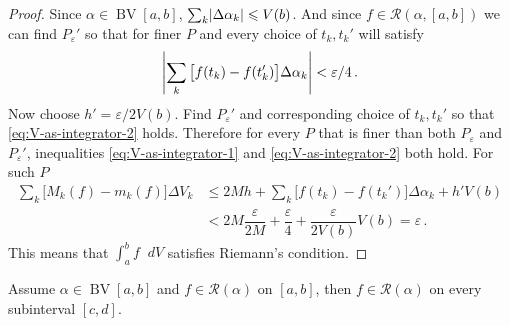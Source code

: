 \documentclass{article}
\newcommand{\Riemann}{\mathcal R}
\DeclarePairedDelimiter\abs{\lvert}{\rvert}
\newcommand{\dd}{\mathop{}\!d}
\DeclareMathOperator{\BV}{BV}
\begin{document}
\begin{proof}
    Since $ \alpha \in \BV[a, b] $, $ \sum_{k} \abs{ \Delta \alpha_k } \leqslant V(b) $. And since $ f \in \Riemann(\alpha, [a, b]) $ we can find $ P_\varepsilon' $ so that for finer $ P $ and every choice of $ t_k, t_k' $ will satisfy
    \[ 
        \abs*{ \sum_{k} \big[ f(t_k) - f(t_k') \big] \Delta \alpha_k } < \varepsilon / 4 \,.
    \]
     Now choose $ h' = \varepsilon / 2V(b) $. Find $ P_\varepsilon' $ and corresponding choice of $ t_k, t_k' $ so that \eqref{eq:V-as-integrator-2} holds. Therefore for every $ P $ that is finer than both $ P_\varepsilon $ and $ P_\varepsilon' $, inequalities \eqref{eq:V-as-integrator-1} and \eqref{eq:V-as-integrator-2} both hold. For such $ P $
    \begin{align*}
        \sum_k \big[ M_k(f) - m_k(f) \big] \Delta V_k &\leqslant 2 M h + \sum_{k} \big[ f(t_k) - f(t_k') \big] \Delta \alpha_k + h' V(b) \\
        &< 2 M \dfrac{\varepsilon}{2M} + \dfrac{\varepsilon}{4} + \dfrac{\varepsilon}{2 V(b)} V(b) = \varepsilon \,.
    \end{align*}
    This means that $ \int_a^b f \dd V $ satisfies Riemann's condition.
\end{proof}

\begin{theorem} \label{thm:BV-integrator-subinterval}
    Assume $ \alpha \in \BV[a, b] $ and $ f \in \Riemann(\alpha) $ on $ [a, b] $, then $ f \in \Riemann(\alpha) $ on every subinterval $ [c, d] $.
\end{theorem}
\end{document}
